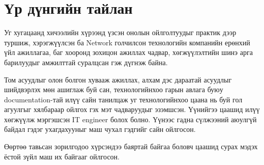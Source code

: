 \section{Үр дүнгийн тайлан}

Уг хугацаанд хичээлийн хүрээнд үзсэн онолын ойлголтуудыг практик дээр туршиж, хэрэгжүүлсэн ба Network голчилсон технологийн компанийн ерөнхий үйл ажиллагаа, баг хооронд зохицон ажиллах чадвар, хөгжүүлэлтийн шинэ арга барилуудыг амжилттай суралцсан гэж дүгнэж байна.

\quad Том асуудлыг олон болгон хувааж ажиллах, алхам дэс дараатай асуудлыг шийдвэрлэх мөн ашиглаж буй сан, технологийнхоо гарын авлага буюу documentation-тай илүү сайн танилцаж уг технологийнхоо цаана нь буй гол агуулгыг хялбараар ойлгох гэх мэт чадваруудыг эзэмшсэн. Үүнийгээ цаашид илүү хөгжүүлж мэргэшсэн IT engineer болох болно. Үүнээс гадна сүлжээний аюулгүй байдал гэдэг ухагдахууныг маш чухал гэдгийг сайн ойлгосон. 

\quad Өөртөө тавьсан зорилгодоо хүрсэндээ баяртай байгаа боловч цаашид сурах мэдэх ёстой зүйл маш их байгааг ойлгосон.